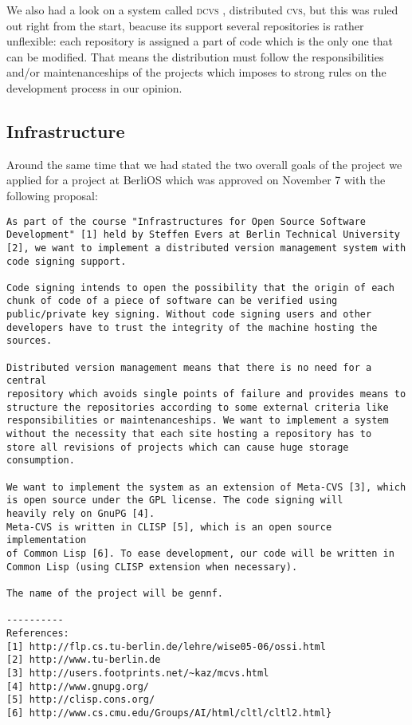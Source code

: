 \documentclass[fleqn, 10pt, a4paper]{report} \usepackage{amssymb}
\begin{document}
We also had a look on a system called \textsc{dcvs} \cite{Dcvs06}, distributed
\textsc{cvs}, but this was ruled out right from the start, beacuse its
support several repositories is rather unflexible: each repository is
assigned a part of code which is the only one that can be modified.
That means the distribution must follow the responsibilities and/or
maintenanceships of the projects which imposes to strong rules on the
development process in our opinion.

\subsection{Infrastructure}

Around the same time that we had stated the two overall goals of the
project we applied for a project at BerliOS which was approved on
November 7 with the following proposal:

{\small
\begin{verbatim}
As part of the course "Infrastructures for Open Source Software
Development" [1] held by Steffen Evers at Berlin Technical University
[2], we want to implement a distributed version management system with
code signing support.

Code signing intends to open the possibility that the origin of each
chunk of code of a piece of software can be verified using
public/private key signing. Without code signing users and other
developers have to trust the integrity of the machine hosting the
sources.

Distributed version management means that there is no need for a central
repository which avoids single points of failure and provides means to
structure the repositories according to some external criteria like
responsibilities or maintenanceships. We want to implement a system
without the necessity that each site hosting a repository has to
store all revisions of projects which can cause huge storage
consumption.

We want to implement the system as an extension of Meta-CVS [3], which
is open source under the GPL license. The code signing will 
heavily rely on GnuPG [4].
Meta-CVS is written in CLISP [5], which is an open source implementation
of Common Lisp [6]. To ease development, our code will be written in
Common Lisp (using CLISP extension when necessary).

The name of the project will be gennf.

----------
References:
[1] http://flp.cs.tu-berlin.de/lehre/wise05-06/ossi.html
[2] http://www.tu-berlin.de
[3] http://users.footprints.net/~kaz/mcvs.html
[4] http://www.gnupg.org/
[5] http://clisp.cons.org/
[6] http://www.cs.cmu.edu/Groups/AI/html/cltl/cltl2.html}
\end{verbatim}}
\end{document}
